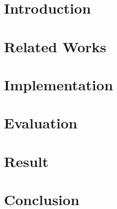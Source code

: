 \documentclass[uplatex,dvipdfmx,a4paper]{jsreport}
\begin{document}
\newpage %

\chapter{Introduction}
\chapter{Related Works}
\chapter{Implementation}
\chapter{Evaluation}
\chapter{Result}
\chapter{Conclusion}

\setcounter{page}{1} %
\pagestyle{plain}
\end{document}
